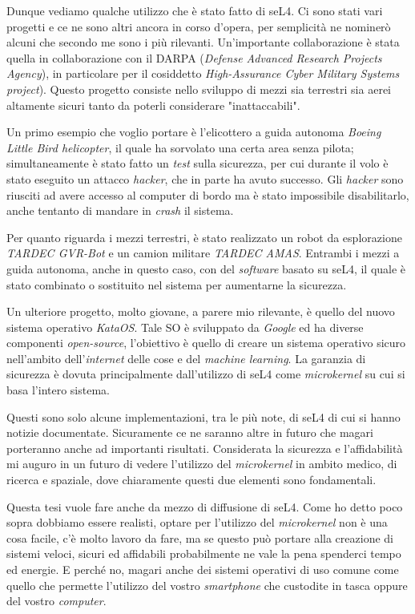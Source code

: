 Dunque vediamo qualche utilizzo che è stato fatto di seL4. Ci sono stati vari progetti e ce ne sono altri ancora in corso d'opera, per semplicità ne nominerò alcuni che secondo me sono i più rilevanti. Un'importante collaborazione è stata quella in collaborazione con il DARPA (\textit{Defense Advanced Research Projects Agency}), in particolare per il cosiddetto \textit{High-Assurance Cyber Military Systems project}). Questo progetto consiste nello sviluppo di mezzi sia terrestri sia aerei altamente sicuri tanto da poterli considerare "inattaccabili".

Un primo esempio che voglio portare è l'elicottero a guida autonoma \textit{Boeing Little Bird helicopter}, il quale ha sorvolato una certa area senza pilota; simultaneamente è stato fatto un \textit{test} sulla sicurezza, per cui durante il volo è stato eseguito un attacco \textit{hacker}, che in parte ha avuto successo. Gli \textit{hacker} sono riusciti ad avere accesso al computer di bordo ma è stato impossibile disabilitarlo, anche tentanto di mandare in \textit{crash} il sistema.

Per quanto riguarda i mezzi terrestri, è stato realizzato un robot da esplorazione \textit{TARDEC GVR-Bot} e un camion militare \textit{TARDEC AMAS}. Entrambi i mezzi a guida autonoma, anche in questo caso, con del \textit{software} basato su seL4, il quale è stato combinato o sostituito nel sistema per aumentarne la sicurezza.

Un ulteriore progetto, molto giovane, a parere mio rilevante, è quello del nuovo sistema operativo \textit{KataOS}. Tale SO è sviluppato da \textit{Google} ed ha diverse componenti \textit{open-source}, l'obiettivo è quello di creare un sistema operativo sicuro nell'ambito dell'\textit{internet} delle cose e del \textit{machine learning}. La garanzia di sicurezza è dovuta principalmente dall'utilizzo di seL4 come \textit{microkernel} su cui si basa l'intero sistema.

Questi sono solo alcune implementazioni, tra le più note, di seL4 di cui si hanno notizie documentate. Sicuramente ce ne saranno altre in futuro che magari porteranno anche ad importanti risultati. Considerata la sicurezza e l'affidabilità mi auguro in un futuro di vedere l'utilizzo del \textit{microkernel} in ambito medico, di ricerca e spaziale, dove chiaramente questi due elementi sono fondamentali.

Questa tesi vuole fare anche da mezzo di diffusione di seL4. Come ho detto poco sopra dobbiamo essere realisti, optare per l'utilizzo del \textit{microkernel} non è una cosa facile, c'è molto lavoro da fare, ma se questo può portare alla creazione di sistemi veloci, sicuri ed affidabili probabilmente ne vale la pena spenderci tempo ed energie. E perché no, magari anche dei sistemi operativi di uso comune come quello che permette l'utilizzo del vostro \textit{smartphone} che custodite in tasca oppure del vostro \textit{computer}.
